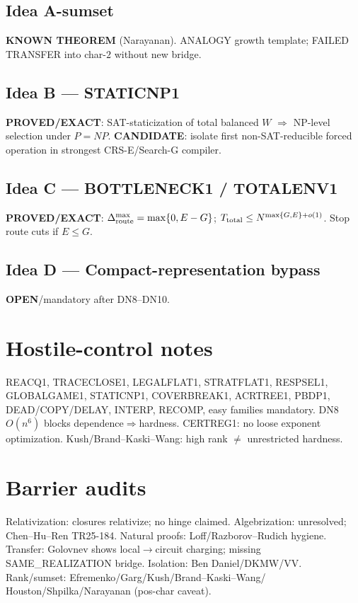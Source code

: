 \documentclass[11pt]{article}
\begin{document}
\subsection*{Idea A-sumset}
\textbf{KNOWN THEOREM} (Narayanan). ANALOGY growth template; FAILED TRANSFER
into char-$2$ without new bridge.

\subsection*{Idea B --- STATICNP1}
\textbf{PROVED/EXACT}: SAT-staticization of total balanced $W$ $\Rightarrow$ NP-level
selection under $P=NP$. \textbf{CANDIDATE}: isolate first non-SAT-reducible forced
operation in strongest CRS-E/Search-G compiler.

\subsection*{Idea C --- BOTTLENECK1 / TOTALENV1}
\textbf{PROVED/EXACT}: $\Delta_{\rm route}^{\max}=\max\{0,E-G\}$;
$T_{\rm total}\le N^{\max\{G,E\}+o(1)}$. Stop route cuts if $E\le G$.

\subsection*{Idea D --- Compact-representation bypass}
\textbf{OPEN}/mandatory after DN8--DN10.

\section*{Hostile-control notes}
REACQ1, TRACECLOSE1, LEGALFLAT1, STRATFLAT1, RESPSEL1, GLOBALGAME1, STATICNP1,
COVERBREAK1, ACRTREE1, PBDP1, DEAD/COPY/DELAY, INTERP, RECOMP, easy families
mandatory. DN8 $O(n^6)$ blocks dependence$\Rightarrow$hardness. CERTREG1: no loose
exponent optimization. Kush/Brand--Kaski--Wang: high rank $\neq$ unrestricted hardness.

\section*{Barrier audits}
Relativization: closures relativize; no hinge claimed. Algebrization: unresolved;
Chen--Hu--Ren TR25-184. Natural proofs: Loff/Razborov--Rudich hygiene. Transfer:
Golovnev shows local$\to$circuit charging; missing SAME\_REALIZATION bridge.
Isolation: Ben Daniel/DKMW/VV. Rank/sumset: Efremenko/Garg/Kush/Brand--Kaski--Wang/
Houston/Shpilka/Narayanan (pos-char caveat).
\end{document}
